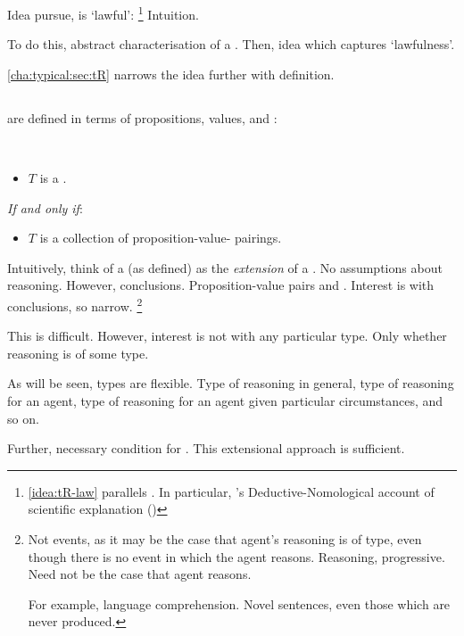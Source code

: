 \begin{note}
  Idea pursue, \tRN{} is `lawful':%
  \footnote{
    \autoref{idea:tR-law} parallels \qWhyV{}.
    In particular, \citeauthor{Hempel:1965aa}'s Deductive-Nomological account of scientific explanation ()
  }
  {
    \color{red}
    Intuition.
  }

  To do this, abstract characterisation of a \tor{}.
  Then, idea which captures `lawfulness'.

  \autoref{cha:typical:sec:tR} narrows the idea further with definition.
\end{note}

\subsection{}
\label{cha:typical:sec:tR:ToRdef}

\begin{note}
   are defined in terms of propositions, values, and :

  \begin{definition}[\tor{2}]
    \label{def:tor}
    \mbox{ }
    \vspace{-\baselineskip}
    \begin{itemize}
    \item
      \(T\) is a \emph{}.
    \end{itemize}

    \emph{If and only if}:

    \begin{itemize}
    \item
      \(T\) is a collection of proposition-value-\pool{} pairings.
    \end{itemize}
    \vspace{-\baselineskip}
  \end{definition}

  Intuitively, think of a \tor{} (as defined) as the \emph{extension} of a \tor{}.
  No assumptions about reasoning.
  However, conclusions.
  Proposition-value pairs and .
  Interest is with conclusions, so narrow.%
  \footnote{
    Not events, as it may be the case that agent's reasoning is of type, even though there is no event in which the agent reasons.
    Reasoning, progressive.
    Need not be the case that agent reasons.

    For example, language comprehension.
    Novel sentences, even those which are never produced.
  }

  This is difficult.
  However, interest is not with any particular type.
  Only whether reasoning is of some type.

  As will be seen, types are flexible.
  Type of reasoning in general, type of reasoning for an agent, type of reasoning for an agent given particular circumstances, and so on.

  Further, necessary condition for \tR{}.
  This extensional approach is sufficient.
\end{note}

